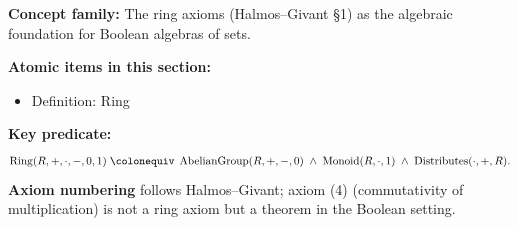 
\begin{tcolorbox}[colback=gray!6, colframe=gray!40, arc=2pt,
  left=6pt, right=6pt, top=4pt, bottom=4pt,
  title={\small\textbf{Toolkit --- Rings of Sets}},
  fonttitle=\small\bfseries]
\textbf{Concept family:} The ring axioms (Halmos--Givant §1) as the algebraic
foundation for Boolean algebras of sets.

\medskip
\textbf{Atomic items in this section:}
\begin{itemize}
  \item Definition: Ring
\end{itemize}

\medskip
\textbf{Key predicate:}
\[
  \operatorname{Ring}(R,+,\cdot,-,0,1)
  \;\colonequiv\;
  \operatorname{AbelianGroup}(R,+,-,0)
  \;\land\;
  \operatorname{Monoid}(R,\cdot,1)
  \;\land\;
  \operatorname{Distributes}(\cdot,+,R).
\]
\textbf{Axiom numbering} follows Halmos--Givant; axiom (4) (commutativity of
multiplication) is not a ring axiom but a theorem in the Boolean setting.
\end{tcolorbox}

